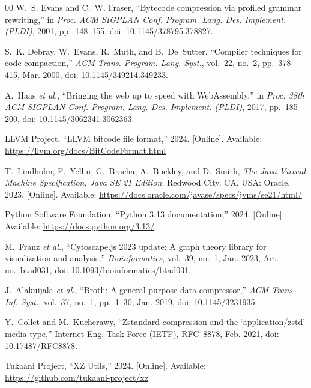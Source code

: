 \documentclass{ieeeaccess}
\begin{document}
\begin{thebibliography}{00}
W.~S. Evans and C.~W. Fraser, ``Bytecode compression via profiled grammar rewriting,'' in \emph{Proc. ACM SIGPLAN Conf. Program. Lang. Des. Implement. (PLDI)}, 2001, pp.~148--155, doi: 10.1145/378795.378827.

S.~K. Debray, W.~Evans, R.~Muth, and B.~De~Sutter, ``Compiler techniques for code compaction,'' \emph{ACM Trans. Program. Lang. Syst.}, vol.~22, no.~2, pp.~378--415, Mar. 2000, doi: 10.1145/349214.349233.

A.~Haas \emph{et al.}, ``Bringing the web up to speed with WebAssembly,'' in \emph{Proc. 38th ACM SIGPLAN Conf. Program. Lang. Des. Implement. (PLDI)}, 2017, pp.~185--200, doi: 10.1145/3062341.3062363.

LLVM Project, ``LLVM bitcode file format,'' 2024. [Online]. Available: \url{https://llvm.org/docs/BitCodeFormat.html}

T.~Lindholm, F.~Yellin, G.~Bracha, A.~Buckley, and D.~Smith, \emph{The Java Virtual Machine Specification, Java SE 21 Edition}. Redwood City, CA, USA: Oracle, 2023. [Online]. Available: \url{https://docs.oracle.com/javase/specs/jvms/se21/html/}

Python Software Foundation, ``Python 3.13 documentation,'' 2024. [Online]. Available: \url{https://docs.python.org/3.13/}

M.~Franz \emph{et al.}, ``Cytoscape.js 2023 update: A graph theory library for visualization and analysis,'' \emph{Bioinformatics}, vol.~39, no.~1, Jan. 2023, Art. no.~btad031, doi: 10.1093/bioinformatics/btad031.

J.~Alakuijala \emph{et al.}, ``Brotli: A general-purpose data compressor,'' \emph{ACM Trans. Inf. Syst.}, vol.~37, no.~1, pp.~1--30, Jan. 2019, doi: 10.1145/3231935.

Y.~Collet and M.~Kucherawy, ``Zstandard compression and the `application/zstd' media type,'' Internet Eng. Task Force (IETF), RFC~8878, Feb. 2021, doi: 10.17487/RFC8878.

Tukaani Project, ``XZ Utils,'' 2024. [Online]. Available: \url{https://github.com/tukaani-project/xz}

\end{thebibliography}

\end{document}

